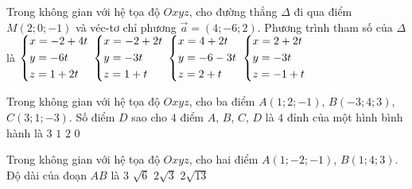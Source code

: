 \begin{ex}%
Trong không gian với hệ tọa độ $Oxyz$, cho đường thẳng $\Delta$ đi qua điểm $M(2; 0; -1)$ và véc-tơ chỉ phương $\overrightarrow{a} = (4; -6; 2)$. Phương trình tham số của $\Delta$ là
\choice
{$\left\{\begin{aligned}&x = -2 + 4t\\&y=-6t\\&z=1+2t\end{aligned}\right.$}
{$\left\{\begin{aligned}&x = -2+2t\\&y=-3t\\&z=1+t\end{aligned}\right.$}
{$\left\{\begin{aligned}&x = 4+2t\\&y=-6-3t\\&z=2+t\end{aligned}\right.$}
{\True $\left\{\begin{aligned}&x=2+2t\\&y=-3t\\&z=-1+t\end{aligned}\right.$}
\end{ex}


\begin{ex} %
Trong không gian với hệ tọa độ $Oxyz$, cho ba điểm $A(1; 2; -1)$, $B(-3; 4; 3)$, $C(3; 1; -3)$. Số điểm $D$ sao cho $4$ điểm $A$, $B$, $C$, $D$ là $4$ đỉnh của một hình bình hành là
\choice
{$3$}
{$1$}
{$2$}
{\True $0$}
\end{ex}



\begin{ex}%
Trong không gian với hệ tọa độ $Oxyz$, cho hai điểm $A(1; -2; -1)$, $B(1; 4; 3)$. Độ dài của đoạn $AB$ là
\choice
{$3$}
{$\sqrt{6}$}
{$2\sqrt{3}$}
{\True $2\sqrt{13}$}
\end{ex}


